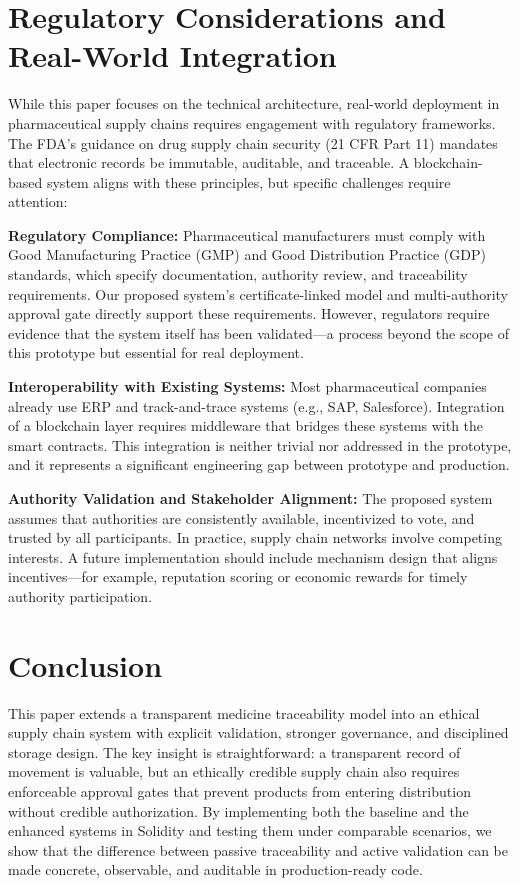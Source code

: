 \documentclass[conference]{IEEEtran}
\begin{document}
\section{Regulatory Considerations and Real-World Integration}

While this paper focuses on the technical architecture, real-world deployment in pharmaceutical supply chains requires engagement with regulatory frameworks. The FDA's guidance on drug supply chain security (21 CFR Part 11) mandates that electronic records be immutable, auditable, and traceable. A blockchain-based system aligns with these principles, but specific challenges require attention:

\textbf{Regulatory Compliance:} Pharmaceutical manufacturers must comply with Good Manufacturing Practice (GMP) and Good Distribution Practice (GDP) standards, which specify documentation, authority review, and traceability requirements. Our proposed system's certificate-linked model and multi-authority approval gate directly support these requirements. However, regulators require evidence that the system itself has been validated—a process beyond the scope of this prototype but essential for real deployment.

\textbf{Interoperability with Existing Systems:} Most pharmaceutical companies already use ERP and track-and-trace systems (e.g., SAP, Salesforce). Integration of a blockchain layer requires middleware that bridges these systems with the smart contracts. This integration is neither trivial nor addressed in the prototype, and it represents a significant engineering gap between prototype and production.

\textbf{Authority Validation and Stakeholder Alignment:} The proposed system assumes that authorities are consistently available, incentivized to vote, and trusted by all participants. In practice, supply chain networks involve competing interests. A future implementation should include mechanism design that aligns incentives—for example, reputation scoring or economic rewards for timely authority participation.

\section{Conclusion}

This paper extends a transparent medicine traceability model into an ethical supply chain system with explicit validation, stronger governance, and disciplined storage design. The key insight is straightforward: a transparent record of movement is valuable, but an ethically credible supply chain also requires enforceable approval gates that prevent products from entering distribution without credible authorization. By implementing both the baseline and the enhanced systems in Solidity and testing them under comparable scenarios, we show that the difference between passive traceability and active validation can be made concrete, observable, and auditable in production-ready code.
\end{document}
